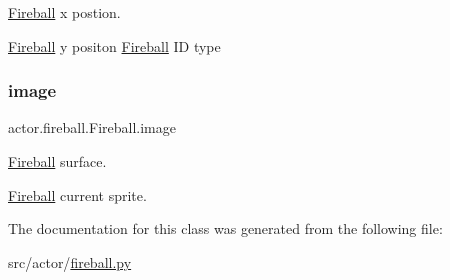 \hyperlink{classactor_1_1fireball_1_1_fireball}{Fireball} x postion. 

\hyperlink{classactor_1_1fireball_1_1_fireball}{Fireball} y positon \hyperlink{classactor_1_1fireball_1_1_fireball}{Fireball} ID type \mbox{\label{classactor_1_1fireball_1_1_fireball_a5dbeecf7c79f7dd02bd262048b79f908}} 
\subsubsection{\texorpdfstring{image}{image}}
{\footnotesize\ttfamily actor.\+fireball.\+Fireball.\+image}



\hyperlink{classactor_1_1fireball_1_1_fireball}{Fireball} surface. 

\hyperlink{classactor_1_1fireball_1_1_fireball}{Fireball} current sprite. 

The documentation for this class was generated from the following file\+:\begin{DoxyCompactItemize}
\item 
src/actor/\hyperlink{fireball_8py}{fireball.\+py}\end{DoxyCompactItemize}
